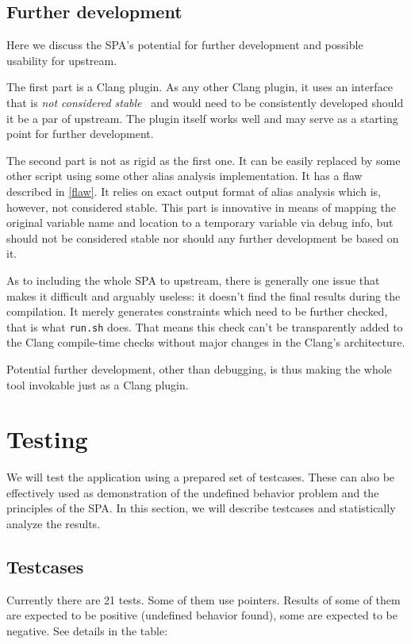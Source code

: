 \subsection{Further development}
Here we discuss the SPA's potential for further development and possible usability for upstream.

The first part is a Clang plugin. As any other Clang plugin, it uses an interface that is \emph{not considered stable}~\cite{clang-unstable} and would need to be consistently developed should it be a par of upstream. The plugin itself works well and may serve as a starting point for further development.

The second part is not as rigid as the first one. It can be easily replaced by some other script using some other alias analysis implementation. It has a flaw described in \ref{flaw}. It relies on exact output format of alias analysis which is, however, not considered stable. This part is innovative in means of mapping the original variable name and location to a temporary variable via debug info, but should not be considered stable nor should any further development be based on it.

As to including the whole SPA to upstream, there is generally one issue that makes it difficult and arguably useless: it doesn't find the final results during the compilation. It merely generates constraints which need to be further checked, that is what \verb|run.sh| does. That means this check can't be transparently added to the Clang compile-time checks without major changes in the Clang's architecture.

Potential further development, other than debugging, is thus making the whole tool invokable just as a Clang plugin.
\section{Testing}
We will test the application using a prepared set of testcases. These can also be effectively used as demonstration of the undefined behavior problem and the principles of the SPA.
In this section, we will describe testcases and statistically analyze the results.
\subsection{Testcases}
Currently there are 21 tests. Some of them use pointers. Results of some of them are expected to be positive (undefined behavior found), some are expected to be negative. See details in the table:\\

